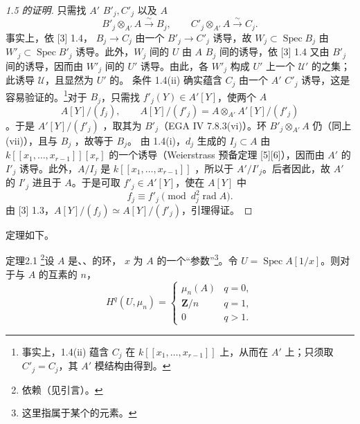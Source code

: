 \begin{proof}[1.5 的证明]
只需找 $A'$  $B'_j,C'_j$ 以及 $A$ 
\[B'_j\otimes_{A'}A\xrightarrow{\sim}B_j,\qquad C'_j\otimes_{A'}A\xrightarrow{\sim}C_j.\]
事实上，依 [3] 1.4， $B_j\to C_j$ 由一个 $B'_j\to C'_j$ 诱导，故 $W_j\subset\operatorname{Spec}B_j$ 由 $W'_j\subset\operatorname{Spec}B'_j$ 诱导。此外，$W_j$ 间的 $U$ 由 $A$  $B_j$ 间的诱导，依 [3] 1.4 又由 $B'_j$ 间的诱导，因而由 $W'_j$ 间的 $U'$ 诱导。由此，各 $W'_j$ 构成 $U'$ 上一个 $\mathcal U'$ 的之集；此诱导 $\mathcal U$，且显然为 $U'$ 的。
条件 1.4(ii) 确实蕴含 $C_j$ 由一个 $A'$  $C'_j$ 诱导，这是容易验证的。\footnote{事实上，1.4(ii) 蕴含 $C_j$ 在 $k[[x_1,\ldots,x_{r-1}]]$ 上，从而在 $A'$ 上；只须取 $C'_j=C_j$，其 $A'$ 模结构由得到。}对于 $B_j$，只需找 $f'_j(Y)\in A'[Y]$，使两个 $A$ 
\[A[Y]/(f_j),\qquad A[Y]/(f'_j)=A\otimes_{A'}A'[Y]/(f'_j)\]
。于是 $A'[Y]/(f'_j)$ ，取其为 $B'_j$（EGA IV 7.8.3(vi)）。环 $B'_j\otimes_{A'}A$ 仍（同上 (vii)），且与 $B_j$ ，故等于 $B_j$。
由 1.4(i)，$d_j$ 生成的 $I_j\subset A$ 由 $k[[x_1,\ldots,x_{r-1}]][x_r]$ 的一个诱导（Weierstrass 预备定理 [5][6]），因而由 $A'$ 的 $I'_j$ 诱导。此外，$A/I_j$ 是 $k[[x_1,\ldots,x_{r-1}]]$ ，所以于 $A'/I'_j$。后者因此，故 $A'$ 的 $I'_j$ 进且于 $A$。于是可取 $f'_j\in A'[Y]$，使在 $A[Y]$ 中
\[f_j\equiv f'_j\pmod{d_j^2\operatorname{rad}A}.\]
由 [3] 1.3，$A[Y]/(f_j)\simeq A[Y]/(f'_j)$，引理得证。
\end{proof}
定理如下。
\begin{SGAresult}{定理}{2.1}
\footnote{依赖（见引言）。}设 $A$ 是、、的环，
$x$ 为 $A$ 的一个“参数”\footnote{这里指属于某个的元素。}。令 $U=\operatorname{Spec}A[1/x]$。则对于与 $A$ 的互素的 $n$，
\[H^q(U,\mu_n)=\begin{cases}\mu_n(A)&q=0,\\\mathbf Z/n&q=1,\\0&q>1.\end{cases}\]
\end{SGAresult}
